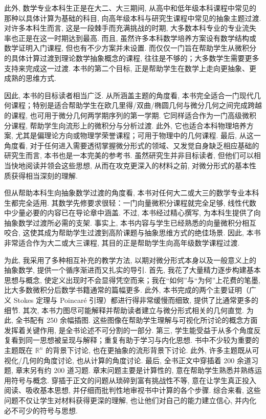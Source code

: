 \documentclass[
    BookTitleCN={微分形式与流形上的微积分：可视化导引},
    BookTitleEN={A Visual Introduction to Differential Forms and Calculus on Manifolds},
    OriginalAuthor={Jon Pierre Fortney},
    OriginalEdition={Birkhäuser},
    OriginalPublisher={Springer Nature},
    OriginalYear={2018},
    Translator={Fingolfin},
    ModelUsed={Qwen-Code},
    BibStyle=numeric
]{mathtranslation}
\theoremstyle{mtsong}
\begin{document}
此外, 数学专业本科生正是在大二、大三期间, 从高中和低年级本科课程中常见的那种以具体计算为基础的科目, 向高年级本科与研究生课程中常见的抽象主题过渡. 对许多本科生而言, 这是一段棘手而充满挑战的时期, 大多数本科专业的专业流失率也正是在这一时期达到最高. 而且, 虽然许多本科数学培养方案设有数学结构或数学证明入门课程, 但也有不少方案并未设置. 而仅仅一门旨在帮助学生从微积分的具体计算过渡到理论数学抽象概念的课程, 往往是不够的；大多数学生需要更多支持来完成这一过渡. 本书的第二个目标, 正是帮助学生在数学上走向更抽象、更成熟的思维方式.

因此, 本书的目标读者相当广泛. 从所涵盖主题的角度看, 本书完全适合一门现代几何课程；特别是适合帮助学生在欧几里得/双曲/椭圆几何与微分几何之间完成跨越的课程, 也可用于微分几何两学期序列的第一学期. 它同样适合作为一门高级微积分课程, 帮助学生向流形上的微积分与分析过渡. 此外, 它也适合本科物理培养方案, 尤其是偏理论方向或物理学荣誉课程；可用于物理中的几何课程. 最后, 从这一角度看, 对于任何进入需要透彻掌握微分形式的领域、又发觉自身缺乏相应基础的研究生而言, 本书也是一本完美的参考书. 虽然研究生并非目标读者, 但他们可以相当快地阅读并领会这些思想, 从而在攻克更深入的材料之前, 对微分形式的基本性质获得相当深刻的理解.

但从帮助本科生向抽象数学过渡的角度看, 本书对任何大二或大三的数学专业本科生都完全适用. 其数学先修要求很轻：一门向量微积分课程就完全足够, 线性代数中少量必要的内容已在导论章中涵盖. 不过, 本书经过精心撰写, 为本科生提供了向抽象数学过渡所必需的支架. 事实上, 本书内容与学生已经熟悉的向量微积分相互咬合, 这使其成为帮助学生过渡到高阶课题与抽象思维方式的绝佳场景. 因此, 本书非常适合作为大二或大三课程, 其目的正是帮助学生向高年级数学课程过渡.

为此, 我采用了多种相互补充的教学方法, 以期对微分形式本身以及一般意义上的抽象数学, 提供一个循序渐进而又扎实的导引. 首先, 我花了大量精力逐步构建基本思想与概念, 使定义出现时不会显得凭空而来；我在``如何''与``为何''上花费的笔墨, 比大多数微积分后数学书籍通常的篇幅更多. 此外, 本书完成的两个主要证明（广义 Stokes 定理与 Poincaré 引理）都进行得非常缓慢而细致, 提供了比通常更多的细节. 其次, 本书力图尽可能解释并帮助读者建立与微分形式相关的几何直觉. 为此, 全书配有 250 余幅插图. 这些图像在帮助学生理解与可视化所讨论的概念方面发挥着关键作用, 是全书论述不可分割的一部分. 第三, 学生能受益于从多个角度反复看到同一思想被呈现与解释；重复有助于学习与内化思想. 书中不少较为重要的主题既在 $\mathbb{R}^n$ 的背景下讨论, 也在更抽象的流形背景下讨论. 此外, 许多主题既从可视化/几何的角度讨论, 也从计算的角度讨论. 最后, 全书正文中穿插着 200 余道习题, 章末另有约 200 道习题. 章末问题主要是计算性的, 意在帮助学生熟悉并熟练运用符号与概念. 穿插于正文的问题从琐碎到富有挑战性不等, 意在让学生真正投入阅读、吸收基本思想, 并仔细而批判性地审视书中计算的各个步骤. 综合来看, 这些问题不仅让学生对材料获得更深的理解, 也让他们对自己的能力建立信心, 并内化必不可少的符号与思想.
\end{document}

